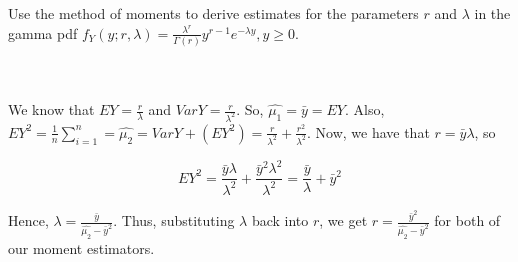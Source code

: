 Use the method of moments to derive estimates for the parameters $r$ and $\lambda$ in the gamma pdf
$f_Y(y;r,\lambda)=\frac{\lambda^r}{\Gamma(r)}y^{r-1}e^{-\lambda y}, y\geq0$.\\\\

\begin{solution}\renewcommand{\qedsymbol}{}\ \\
    We know that $EY=\frac{r}{\lambda}$ and $VarY=\frac{r}{\lambda^2}$. So, $\hat{\mu_1}=\bar{y}=EY$.
    Also, $EY^2=\frac1n\sum_{i=1}^n=\hat{\mu_2}=VarY+(EY^2)=\frac{r}{\lambda^2}+\frac{r^2}{\lambda^2}$.
    Now, we have that $r=\bar{y}\lambda$, so

    $$EY^2=\frac{\bar{y}\lambda}{\lambda^2}+\frac{\bar{y}^2\lambda^2}{\lambda^2}
    =\frac{\bar{y}}{\lambda}+\bar{y}^2$$

    Hence, $\lambda=\frac{\bar{y}}{\hat{\mu_2}-\bar{y}^2}$. Thus, substituting $\lambda$ back into $r$,
    we get $r=\frac{\bar{y}^2}{\hat{\mu_2}-\bar{y}^2}$ for both of our moment estimators.

\end{solution}